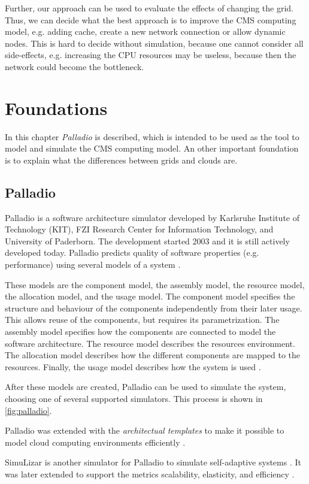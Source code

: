 Further, our approach can be used to evaluate the effects of changing the grid. Thus, we can decide what the best approach is to improve the CMS computing model, e.g. adding cache, create a new network connection or allow dynamic nodes.
This is hard to decide without simulation, because one cannot consider all side-effects, e.g. increasing the CPU resources may be useless, because then the network could become the bottleneck.

\chapter {Foundations}
In this chapter \textit{Palladio} is described, which is intended to be used as the tool to model and simulate the CMS computing model.
An other important foundation is to explain what the differences between grids and clouds are.

\section{Palladio}
Palladio is a software architecture simulator developed by Karlsruhe Institute of Technology (KIT), FZI Research Center for Information Technology, and University of Paderborn. The development started 2003 and it is still actively developed today. Palladio predicts quality of software properties (e.g. performance) using several models of a system \cite{BECKER20093}.

These models are the component model, the assembly model, the resource model, the allocation model, and the usage model.
The component model specifies the structure and behaviour of the components independently from their later usage. This allows reuse of the components,  but requires its parametrization.
The assembly model specifies how the components are connected to model the software architecture. 
The resource model  describes the resources environment.
The allocation model describes how the different components are mapped to the resources.
Finally, the usage model describes how the system is used  \cite{BECKER20093}.

After these models are created, Palladio can be used to simulate the system, choosing one of several supported simulators. This process is shown in \ref{fig:palladio}. 

Palladio was extended with the \textit{architectual templates} to make it possible to model cloud computing environments efficiently \cite{arch}.

SimuLizar is another simulator for Palladio to simulate self-adaptive systems \cite{becker2013simulizar}. It was later extended to support the metrics scalability, elasticity, and efficiency \cite{arch}.

